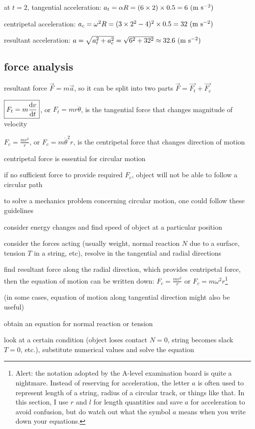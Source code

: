 at $t=2$, tangential acceleration: $a_t = \alpha R = (6\times2)\times 0.5 = 6 \text{ (m s$^{-2}$)}$

centripetal acceleration: $a_c = \omega^2 R = (3\times2^2 - 4)^2 \times 0.5 = 32\text{ (m s$^{-2}$)}$

resultant acceleration: $a = \sqrt{a_t^2 + a_c^2} = \sqrt{6^2 + 32^2} \approx 32.6\text{ (m s$^{-2}$)}$ \eoe


\subsection{force analysis}

resultant force $\vec{F} = m\vec{a}$, so it can be split into two parts $\vec{F} = \vec{F_t} + \vec{F_c}$

$\boxed{F_t = m\frac{\mathrm{d}v}{\mathrm{d}t}}$, or $\boxed{F_t = m r\ddot{\theta}}$, is the tangential force that changes magnitude of velocity

$\boxed{F_c = \frac{mv^2}{r}}$, or $\boxed{F_c = m \dot{\theta}^2 r}$, is the centripetal force that changes direction of motion

centripetal force is essential for circular motion

if no sufficient force to provide required $F_c$, object will not be able to follow a circular path

\vspace*{\baselineskip}

to solve a mechanics problem concerning circular motion, one could follow these guidelines

\begin{compactenum}
	\item consider energy changes and find speed of object at a particular position
	
	\item consider the forces acting (usually weight, normal reaction $N$ due to a surface, tension $T$ in a string, etc), resolve in the tangential and radial directions
	
	\item find resultant force along the radial direction, which provides centripetal force, then the equation of motion can be written down: $F_c = \frac{mv^2}{r}$ or $F_c=m\omega^2r$\footnote{Alert: the notation adopted by the A-level examination board is quite a nightmare. Instead of reserving for acceleration, the letter $a$ is often used to represent length of a string, radius of a circular track, or things like that. In this section, I use $r$ and $l$ for length quantities and save $a$ for acceleration to avoid confusion, but do watch out what the symbol $a$ means when you write down your equations.}
	
	(in some cases, equation of motion along tangential direction might also be useful)
	
	\item obtain an equation for normal reaction or tension
	
	\item look at a certain condition (object loses contact $N=0$, string becomes slack $T=0$, etc.), substitute numerical values and solve the equation
\end{compactenum}

